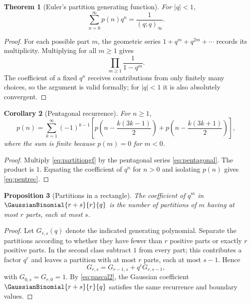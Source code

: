 \documentclass[11pt]{article}
\numberwithin{equation}{section}
\newtheorem{theorem}{Theorem}[section]
\newtheorem{proposition}[theorem]{Proposition}
\newtheorem{corollary}[theorem]{Corollary}
\theoremstyle{definition}
\theoremstyle{remark}
\begin{document}
\begin{theorem}[Euler's partition generating function]\label{thm:partitiongf}
For $|q|<1$,
\begin{equation}\label{eq:partitiongf}
\sum_{n=0}^{\infty}p(n)q^n=\frac1{(q;q)_\infty}.
\end{equation}
\end{theorem}
\begin{proof}
For each possible part $m$, the geometric series
$1+q^m+q^{2m}+\cdots$ records its multiplicity.  Multiplying for all
$m\ge1$ gives
\[
\prod_{m\ge1}\frac1{1-q^m}.
\]
The coefficient of a fixed $q^n$ receives contributions from only finitely
many choices, so the argument is valid formally; for $|q|<1$ it is also
absolutely convergent.
\end{proof}

\begin{corollary}[Pentagonal recurrence]\label{cor:pentrec}
For $n\ge1$,
\begin{equation}\label{eq:pentrec}
p(n)=\sum_{k=1}^{\infty}(-1)^{k-1}
\left[p\!\left(n-\frac{k(3k-1)}2\right)
+p\!\left(n-\frac{k(3k+1)}2\right)\right],
\end{equation}
where the sum is finite because $p(m)=0$ for $m<0$.
\end{corollary}
\begin{proof}
Multiply \eqref{eq:partitiongf} by the pentagonal series
\eqref{eq:pentagonal}.  The product is $1$.  Equating the coefficient of
$q^n$ for $n>0$ and isolating $p(n)$ gives \eqref{eq:pentrec}.
\end{proof}

\begin{proposition}[Partitions in a rectangle]\label{prop:rectangle}
The coefficient of $q^m$ in $\GaussianBinomial{r+s}{r}{q}$ is the number of partitions of
$m$ having at most $r$ parts, each at most $s$.
\end{proposition}
\begin{proof}
Let $G_{r,s}(q)$ denote the indicated generating polynomial.  Separate the
partitions according to whether they have fewer than $r$ positive parts or
exactly $r$ positive parts.  In the second class subtract $1$ from every part;
this contributes a factor $q^r$ and leaves a partition with at most $r$ parts,
each at most $s-1$.  Hence
\[
G_{r,s}=G_{r-1,s}+q^rG_{r,s-1},
\]
with $G_{0,s}=G_{r,0}=1$.  By \eqref{eq:pascal2}, the Gaussian coefficient
$\GaussianBinomial{r+s}{r}{q}$ satisfies the same recurrence and boundary values.
\end{proof}
\end{document}
